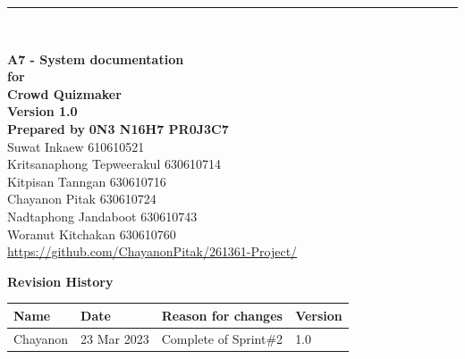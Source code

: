 \documentclass[ 10pt]{report}
\begin{document}
    \begin{titlepage}
        \noindent\rule{\textwidth}{5pt} \\
        \begin{flushright}
            \Huge\textbf{A7 - System documentation} \\[2\baselineskip]
            \large\textbf{for} \\
            \huge\textbf{Crowd Quizmaker} \\[2\baselineskip]
            \large\textbf{Version 1.0} \\[2\baselineskip]
            \large\textbf{Prepared by} \LARGE\textbf{0N3 N16H7 PR0J3C7} \\[0.5\baselineskip]
            \normalsize{
                Suwat Inkaew 610610521 \\
                Kritsanaphong Tepweerakul 630610714 \\
                Kitpisan Tanngan 630610716 \\
                Chayanon Pitak 630610724 \\
                Nadtaphong Jandaboot 630610743 \\
                Woranut Kitchakan 630610760
            } \\[2\baselineskip]
            \large{\href{https://github.com/ChayanonPitak/261361-Project/}{https://github.com/ChayanonPitak/261361-Project/}}
        \end{flushright}
        \pagebreak

        \LARGE\textbf{Revision History} \\[0.5\baselineskip]
        \normalsize{
            \begin{tabular}{| m{8em} | m{6em} | m{20em} | m{5em} |}
                \hline
                \textbf{Name} & \textbf{Date} & \textbf{Reason for changes} & \textbf{Version}\\ 
                \hline\hline
                Chayanon & 23 Mar 2023 & Complete of Sprint\#2 & 1.0 \\
                \hline
            \end{tabular}
        }

    \end{titlepage}


     \renewcommand*\contentsname{Table of Contents}
     \tableofcontents
     \pagebreak
\end{document}
